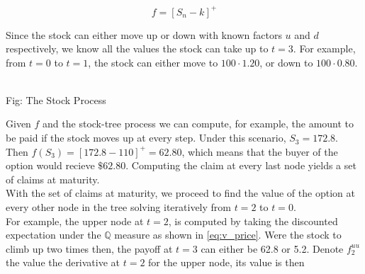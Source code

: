 \documentclass{article}
\begin{document}
\begin{equation}
    f = [S_n - k]^+
\end{equation}

Since the stock can either move up or down with known factors $u$ and $d$ respectively, we know all the values the stock can take up to $t=3$. For example, from $t=0$ to $t=1$, the stock can either move to $100 \cdot 1.20$, or down to $100 \cdot 0.80$.

\begin{center}
\\
\caption{Fig: The Stock Process}
\end{center}

Given $f$ and the stock-tree process we can compute, for example, the amount to be paid if the stock moves up at every step. Under this scenario, $S_3 = 172.8$. Then $f(S_3) = [172.8 - 110]^+ = 62.80$, which means that the buyer of the option would recieve $\$62.80$. Computing the claim at every last node yields a set of claims at maturity.\\

With the set of claims at maturity, we proceed to find the value of the option at every other node in the tree solving iteratively from $t=2$ to $t=0$.\\

For example, the upper node at $t=2$, is computed by taking the discounted expectation under the $\mathbb{Q}$ measure as shown in \ref{eq:v_price}. Were the stock to climb up two times then, the payoff at $t=3$ can either be 62.8 or 5.2. Denote $f^{uu}_2$ the value the derivative at $t=2$ for the upper node, its value is then
\end{document}
